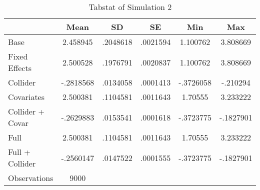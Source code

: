 \begin{table}[htbp]\centering
\def\sym#1{\ifmmode^{#1}\else\(^{#1}\)\fi}
\caption{Tabstat of Simulation 2}
\begin{tabular}{l*{1}{ccccc}}
\hline\hline
                    &        Mean&          SD&          SE&         Min&         Max\\
\hline
Base                &    2.458945&    .2048618&    .0021594&    1.100762&    3.808669\\
Fixed Effects       &    2.500528&    .1976791&    .0020837&    1.100762&    3.808669\\
Collider            &   -.2818568&    .0134058&    .0001413&   -.3726058&    -.210294\\
Covariates          &    2.500381&    .1104581&    .0011643&     1.70555&    3.233222\\
Collider + Covar    &   -.2629883&    .0153541&    .0001618&   -.3723775&   -.1827901\\
Full                &    2.500381&    .1104581&    .0011643&     1.70555&    3.233222\\
Full + Collider     &   -.2560147&    .0147522&    .0001555&   -.3723775&   -.1827901\\
\hline
Observations        &        9000&            &            &            &            \\
\hline\hline
\end{tabular}
\end{table}
